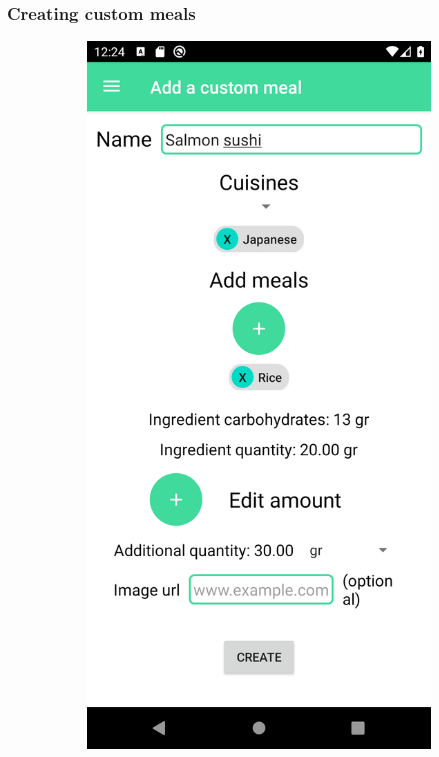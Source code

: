 \subsubsection{Creating custom meals}

\begin{figure}[H]
    \captionsetup[subfigure]{justification=centering}
    \begin{center}
        \begin{subfigure}{.3\textwidth}
            \includegraphics[scale=0.1, width=\textwidth]{_figures/create_custom_meal.png}

\end{subfigure}
\end{center}
\end{figure}
